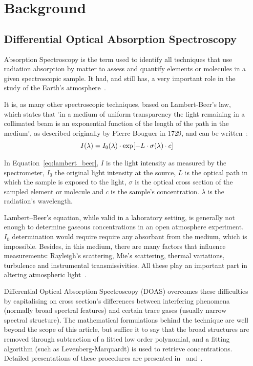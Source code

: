 
\section{Background}
\label{sec:background}

\subsection{Differential Optical Absorption Spectroscopy}
\label{ssub:differential_optical_absorption_spectroscopy}
Absorption Spectroscopy is the term used to identify all techniques that
use radiation absorption by matter to assess and quantify elements or
molecules in a given spectroscopic sample. It had, and still has, a very
important role in the study of the Earth's atmosphere~\cite{Platt2007}.

It is, as many other spectroscopic techniques, based on Lambert-Beer's
law, which states that 'in a medium of uniform transparency the light
remaining in a collimated beam is an exponential function of the length
of the path in the medium', as described originally by Pierre Bouguer in
1729, and can be written~\cite{Platt2007}:
\begin{equation}
    \centering
    I(\lambda) = I_0(\lambda) \cdot \exp[-L \cdot \sigma(\lambda) \cdot c]
    \label{eq:lambert_beer}   
\end{equation}

In Equation~\ref{eq:lambert_beer}, $I$ is the light intensity as measured by the
spectrometer, $I_0$ the original light intensity at the source, $L$ is
the optical path in which the sample is exposed to the light, $\sigma$
is the optical cross section of the sampled element or molecule and $c$
is the sample's concentration. $\lambda$ is the radiation's wavelength.

Lambert--Beer's equation, while valid in a laboratory setting, is
generally not enough to determine gaseous concentrations in an open
atmosphere experiment. $I_0$ determination would require require any
absorbant from the medium, which is impossible. Besides, in this medium,
there are many factors that influence measurements: Rayleigh's
scattering, Mie's scattering, thermal variations, turbulence and
instrumental transmissivities. All these play an important part in
altering atmospheric light~\cite{Platt2007, Merlaud2013}.

Differential Optical Absorption Spectroscopy (DOAS) overcomes these
difficulties by capitalising on cross section's differences between
interfering phenomena (normally broad spectral features) and certain
trace gases (usually narrow spectral structure).  The mathematical
formulations behind the technique are well beyond the scope of this
article, but suffice it to say that the broad structures are removed
through subtraction of a fitted low order polynomial, and a fitting
algorithm (such as Levenberg-Marquardt) is used to retrieve
concentrations. Detailed presentations of these procedures are presented
in~\cite{Platt2007} and~\cite{Merlaud2013}.

